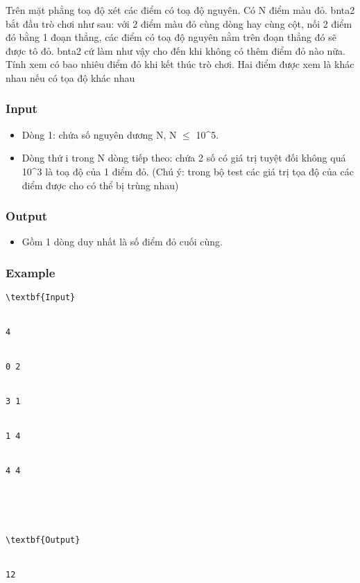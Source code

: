 



   Trên mặt phẳng toạ độ xét các điểm có toạ độ nguyên. Có N điểm màu đỏ. bnta2 bắt đầu trò chơi như sau: với 2 điểm màu đỏ cùng dòng hay cùng cột, nối 2 điểm đó bằng 1 đoạn thẳng, các điểm có toạ độ nguyên nằm trên đoạn thẳng đó sẽ được tô đỏ. bnta2 cứ làm như vậy cho đến khi không có thêm điểm đỏ nào nữa.   Tính xem có bao nhiêu điểm đỏ khi kết thúc trò chơi. Hai điểm được xem là khác nhau nếu có tọa độ khác nhau  

\subsubsection{   Input  }
\begin{itemize}
	\item     Dòng 1: chứa số nguyên dương N, N $\le$ 10^5.   
	\item     Dòng thứ i trong N dòng tiếp theo: chứa 2 số có giá trị tuyệt đối không quá 10^3 là toạ độ của 1 điểm đỏ. (Chú ý: trong bộ test các giá trị tọa độ của các điểm được cho có thể bị trùng nhau)   
\end{itemize}

\subsubsection{   Output  }
\begin{itemize}
	\item     Gồm 1 dòng duy nhất là số điểm đỏ cuối cùng.   
\end{itemize}

\subsubsection{   Example  }
\begin{verbatim}
\textbf{Input}


4 


0 2 


3 1 


1 4 


4 4 





\textbf{Output}


12\end{verbatim}
